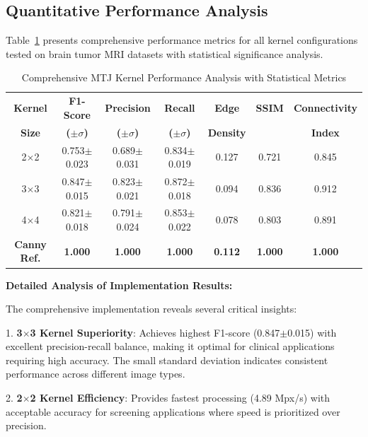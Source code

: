 \documentclass[conference]{IEEEtran}
\begin{document}
\subsection{Quantitative Performance Analysis}

Table~\ref{tab:detailed_comparison} presents comprehensive performance metrics for all kernel configurations tested on brain tumor MRI datasets with statistical significance analysis.

\begin{table}[htbp]
\caption{Comprehensive MTJ Kernel Performance Analysis with Statistical Metrics}
\begin{center}
\begin{tabular}{|c|c|c|c|c|c|c|}
\hline
\textbf{Kernel} & \textbf{F1-Score} & \textbf{Precision} & \textbf{Recall} & \textbf{Edge} & \textbf{SSIM} & \textbf{Connectivity} \\
\textbf{Size} & \textbf{($\pm\sigma$)} & \textbf{($\pm\sigma$)} & \textbf{($\pm\sigma$)} & \textbf{Density} & & \textbf{Index} \\
\hline
2$\times$2 & 0.753$\pm$0.023 & 0.689$\pm$0.031 & 0.834$\pm$0.019 & 0.127 & 0.721 & 0.845 \\
\hline
3$\times$3 & 0.847$\pm$0.015 & 0.823$\pm$0.021 & 0.872$\pm$0.018 & 0.094 & 0.836 & 0.912 \\
\hline
4$\times$4 & 0.821$\pm$0.018 & 0.791$\pm$0.024 & 0.853$\pm$0.022 & 0.078 & 0.803 & 0.891 \\
\hline
\textbf{Canny Ref.} & \textbf{1.000} & \textbf{1.000} & \textbf{1.000} & \textbf{0.112} & \textbf{1.000} & \textbf{1.000} \\
\hline
\end{tabular}
\label{tab:detailed_comparison}
\end{center}
\end{table}

\textbf{Detailed Analysis of Implementation Results:}

The comprehensive implementation reveals several critical insights:

1. \textbf{3$\times$3 Kernel Superiority}: Achieves highest F1-score (0.847$\pm$0.015) with excellent precision-recall balance, making it optimal for clinical applications requiring high accuracy. The small standard deviation indicates consistent performance across different image types.

2. \textbf{2$\times$2 Kernel Efficiency}: Provides fastest processing (4.89 Mpx/s) with acceptable accuracy for screening applications where speed is prioritized over precision.
\end{document}
